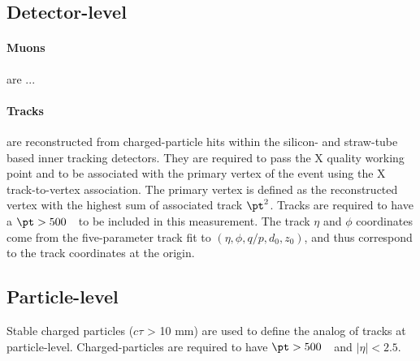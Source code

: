 \subsection{Detector-level}

\paragraph{Muons} are ...

\paragraph{Tracks} are reconstructed from charged-particle hits within the silicon- and straw-tube based inner tracking detectors. They are required to pass the X quality working point and to be associated with the primary vertex of the event using the X track-to-vertex association.  The primary vertex is defined  as the reconstructed vertex with the highest sum of associated track $\pt^2$.  Tracks are required to have a $\pt>500$~\MeV~to be included in this measurement.  The track $\eta$ and $\phi$ coordinates come from the five-parameter track fit to $(\eta,\phi,q/p,d_0,z_0)$, and thus correspond to the track coordinates at the origin.  

\subsection{Particle-level}

Stable charged particles ($c\tau$ > 10 mm) are used to define the analog of tracks at particle-level.  Charged-particles are required to have $\pt > 500$~\MeV~and $|\eta|<2.5$.

